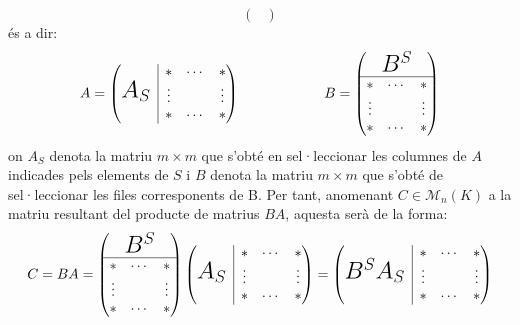 \documentclass[11pt,a4paper]{article}
\newcommand{\as}{\mbox{\LARGE $A_S$}}
\newcommand{\bs}{\mbox{\LARGE $B^S$}}
\newcommand{\rvline}{\hspace*{-\arraycolsep}\vline\hspace*{-\arraycolsep}}
\begin{document}
\begin{enumerate}
$$\begin{pmatrix}
   \end{pmatrix}$$
   és a dir:
   $$
    A=\begin{pmatrix}
    \as & \rvline & \begin{matrix}
    \ast & \cdots & \ast \\
    \vdots & & \vdots \\
    \ast & \cdots & \ast
    \end{matrix} \\
    \end{pmatrix}\qquad\qquad\qquad
    B=\begin{pmatrix}
    \bs \\
    \hline
    \begin{matrix}
    \ast & \cdots & \ast \\
    \vdots & & \vdots \\
    \ast & \cdots & \ast
    \end{matrix}
    \end{pmatrix}
   $$
   on $A_S$ denota la matriu $m\times m$ que s’obté en sel·leccionar les columnes de $A$ indicades pels elements de $S$ i $B$ denota la matriu $m\times m$ que s’obté de sel·leccionar les files corresponents de B. Per tant, anomenant $C\in \mathcal{M}_n (K)$ a la matriu resultant del producte de matrius $BA$, aquesta serà de la forma:
   $$
   C=BA=\begin{pmatrix}
    \bs \\
    \hline
    \begin{matrix}
    \ast & \cdots & \ast \\
    \vdots & & \vdots \\
    \ast & \cdots & \ast
    \end{matrix}
    \end{pmatrix}\begin{pmatrix}
    \as & \rvline & \begin{matrix}
    \ast & \cdots & \ast \\
    \vdots & & \vdots \\
    \ast & \cdots & \ast
    \end{matrix} \\
    \end{pmatrix}=\begin{pmatrix}
    \bs \as & \rvline & \begin{matrix}
    \ast & \cdots & \ast \\
    \vdots & & \vdots \\
    \ast & \cdots & \ast
    \end{matrix} \\

\end{pmatrix}$$
\end{enumerate}
\end{document}
